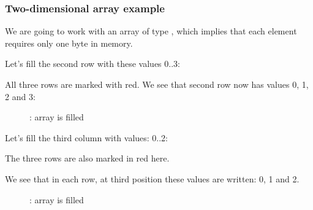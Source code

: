 \subsubsection{Two-dimensional array example}

We are going to work with an array of type \Tchar, which implies that each element requires only one 
byte in memory.

\myindex{\olly}

Let's fill the second row with these values 0..3:



All three rows are marked with red. 
We see that second row now has values 0, 1, 2 and 3:

\begin{figure}[H]
\centering
{}
\caption{\olly: array is filled}
\end{figure}

\myindex{\olly}

Let's fill the third column with values: 0..2:



The three rows are also marked in red here. 

We see that in each row, at third position these values are written: 0, 1 and 2.

\begin{figure}[H]
\centering
{}
\caption{\olly: array is filled}
\end{figure}

